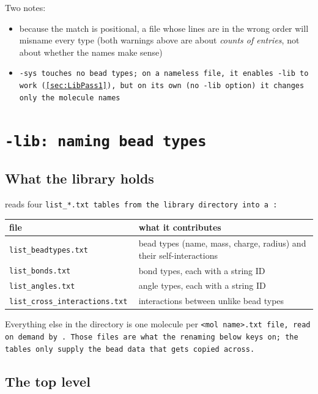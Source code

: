 \noindent
Two notes:

\begin{itemize}[nosep,leftmargin=20pt]
  \item because the match is positional, a file whose lines are in the wrong
    order will misname every type (both warnings above are about \emph{counts of
    entries}, not about whether the names make sense)
  \item \tt{-sys} touches no bead types; on a nameless \data file, it enables
    \tt{-lib} to work (\cref{sec:LibPass1}), but on its own (no \tt{-lib}
    option) it changes only the
    molecule names
\end{itemize}

\section{\tt{-lib}: naming bead types}\label{sec:LibOption}

\subsection{What the library holds}\label{ssec:LibContents}

 reads four \tt{list_*.txt} tables from the library
directory into a :

\begin{longtable}{p{}p{}}
  \toprule
  file & what it contributes \\
  \midrule
  \tt{list_beadtypes.txt} & bead types (name, mass, charge, radius) and their
    self-interactions \\
  \tt{list_bonds.txt}      & bond types, each with a string ID \\
  \tt{list_angles.txt}     & angle types, each with a string ID \\
  \tt{list_cross_interactions.txt} & interactions between unlike bead types \\
  \bottomrule
\end{longtable}

\noindent
Everything else in the directory is one molecule per \tt{<mol name>.txt} file,
read on demand by . Those files are what the renaming
below keys on; the tables only supply the bead data that gets copied across.

\subsection{The top level}\label{ssec:LibApply}

